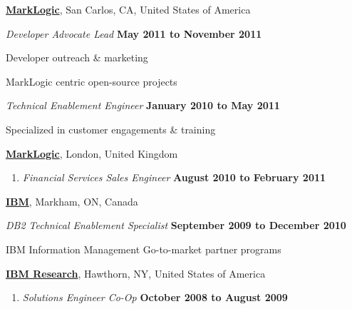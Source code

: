 \documentclass[10pt]{article}
\newenvironment{outerlist}[1][\enskip\textbullet]%
        {\begin{enumerate}[#1]}{\end{enumerate}%
         \vspace{-.6\baselineskip}}
\newenvironment{innerlist}[1][\enskip\textbullet]%
        {\begin{compactenum}[#1]}{\end{compactenum}}
\newcommand{\blankline}{\quad\pagebreak[2]}
\begin{document}
\href{http://www.marklogic.com/}{\textbf{MarkLogic}}, 
San Carlos, CA, United States of America
\begin{outerlist}

  \item[] \textit{Developer Advocate Lead}%
          \hfill \textbf{May 2011 to November 2011}
  \begin{innerlist}
    \item Developer outreach \& marketing
    \item MarkLogic centric open-source projects
  \end{innerlist}
  \item[] \textit{Technical Enablement Engineer}%
            \hfill \textbf{January 2010 to May 2011}
    \begin{innerlist}
  \item Specialized in customer engagements \& training
    \end{innerlist}
\end{outerlist}

\blankline

\href{http://www.marklogic.com/}{\textbf{MarkLogic}}, 
London, United Kingdom
\begin{outerlist}

  \item[] \textit{Financial Services Sales Engineer}%
          \hfill \textbf{August 2010 to February 2011}
\end{outerlist}


\blankline

\href{http://www.ibm.com/}{\textbf{IBM}}, 
Markham, ON, Canada
\begin{outerlist}

  \item[] \textit{DB2 Technical Enablement Specialist}%
          \hfill \textbf{September 2009 to December 2010}
  \begin{innerlist}
\item IBM Information Management Go-to-market partner programs
  \end{innerlist}

\end{outerlist}

\blankline

\href{http://www.ibm.com/}{\textbf{IBM Research}}, 
Hawthorn, NY, United States of America
\begin{outerlist}

  \item[] \textit{Solutions Engineer Co-Op}%
          \hfill \textbf{October 2008 to August 2009}

\end{outerlist}
\end{document}
